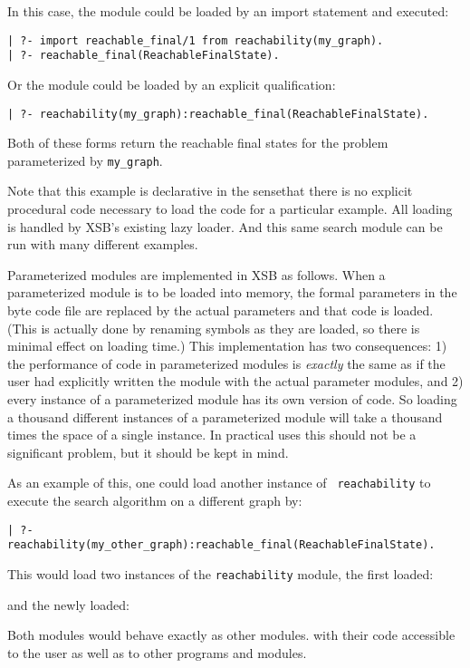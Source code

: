 In this case, the module could be loaded by an import statement and
executed:
\begin{verbatim}
| ?- import reachable_final/1 from reachability(my_graph).
| ?- reachable_final(ReachableFinalState).
\end{verbatim}
Or the module could be loaded by an explicit qualification:
\begin{verbatim}
| ?- reachability(my_graph):reachable_final(ReachableFinalState).
\end{verbatim}
Both of these forms return the reachable final states for the problem
parameterized by {\tt my\_graph}.

Note that this example is declarative in the sensethat there is no
explicit procedural code necessary to load the code for a particular
example.  All loading is handled by XSB's existing lazy loader.  And
this same search module can be run with many different examples.

Parameterized modules are implemented in XSB as follows.  When a
parameterized module is to be loaded into memory, the formal
parameters in the byte code file are replaced by the actual parameters
and that code is loaded.  (This is actually done by renaming symbols
as they are loaded, so there is minimal effect on loading time.)  This
implementation has two consequences: 1) the performance of code in
parameterized modules is {\em exactly} the same as if the user had
explicitly written the module with the actual parameter modules, and
2) every instance of a parameterized module has its own version of
code.  So loading a thousand different instances of a parameterized
module will take a thousand times the space of a single instance.  In
practical uses
this should not be a significant problem, but it should be kept in
mind.

As an example of this, one could load another instance of {\tt
  reachability} to execute the search algorithm on a different graph
by:
\begin{verbatim}
| ?- reachability(my_other_graph):reachable_final(ReachableFinalState).
\end{verbatim}
This would load two instances of the {\tt reachability} module, the
first loaded:


\noindent
and the newly loaded:


\noindent
Both modules would behave exactly as other modules. with their code
accessible to the user as well as to other programs and modules.


